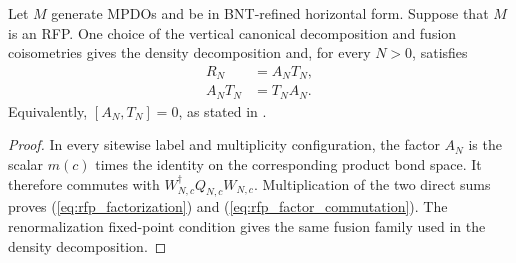 \begin{corollary}%
    \label{cor:mpdo_topological_density_factor_commutator}
    \leanok
    Let $M$ generate MPDOs and be in BNT-refined horizontal
    form. Suppose that $M$ is an RFP.
    One choice of the vertical canonical decomposition and fusion
    coisometries gives the density decomposition and, for every $N>0$,
    satisfies
    \begin{align}
        R_N
         & =A_NT_N,
        \label{eq:rfp_factorization} \\
        A_NT_N
         & =T_NA_N.
        \label{eq:rfp_factor_commutation}
    \end{align}
    Equivalently, $[A_N,T_N]=0$, as stated in
    \cite[lines~1000--1002]{Cirac2016MPDO_arXiv}.
\end{corollary}
\begin{proof}\leanok
    In every sitewise label and multiplicity configuration, the factor $A_N$
    is the scalar $m(c)$ times the identity on the corresponding product
    bond space.
    It therefore commutes with
    $W_{N,c}^{\dagger}Q_{N,c}W_{N,c}$. Multiplication of the two direct sums
    proves (\ref{eq:rfp_factorization}) and
    (\ref{eq:rfp_factor_commutation}). The renormalization fixed-point
    condition gives the same fusion family used in the density
    decomposition.
\end{proof}
